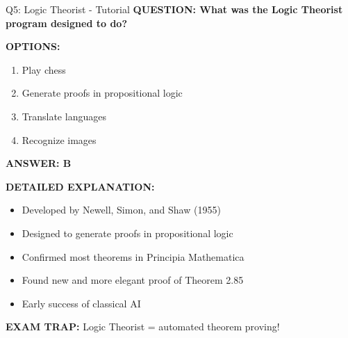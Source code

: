 \documentclass[8pt]{beamer}
\begin{document}
	\begin{frame}{Q5: Logic Theorist - Tutorial}
		\fontsize{6.5}{7.5}\selectfont
		\textbf{QUESTION: What was the Logic Theorist program designed to do?}
		
		\vspace{0.1cm}
		\textbf{OPTIONS:}
		\begin{enumerate}
			\item Play chess
			\item Generate proofs in propositional logic
			\item Translate languages
			\item Recognize images
		\end{enumerate}
		
		\vspace{0.1cm}
		\textcolor{myblue}{\textbf{ANSWER: B}}
		
		\vspace{0.1cm}
		\textbf{DETAILED EXPLANATION:}
		\begin{itemize}
			\item Developed by Newell, Simon, and Shaw (1955)
			\item Designed to generate proofs in propositional logic
			\item Confirmed most theorems in Principia Mathematica
			\item Found new and more elegant proof of Theorem 2.85
			\item Early success of classical AI
		\end{itemize}
		
		\vspace{0.1cm}
		\textcolor{myred}{\textbf{EXAM TRAP:}} Logic Theorist = \textcolor{myblue}{automated theorem proving}!
	\end{frame}
	
\end{document}
